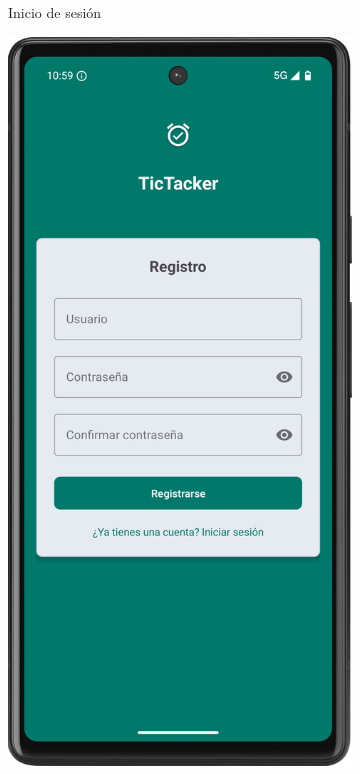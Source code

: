 \begin{figure}[H]
\begin{subfigure}[b]{0.3\textwidth}
         \caption{Inicio de sesión}
         \label{fig:login}
     \end{subfigure}
     \hfill
     \begin{subfigure}[b]{0.3\textwidth}
         \centering
         \includegraphics[width=\textwidth]{root/signup.png}

\end{subfigure}
\end{figure}
